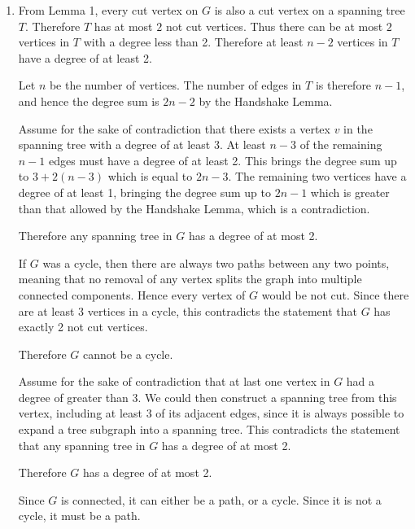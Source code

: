 \documentclass{article}
\begin{document}
\begin{solution}
\begin{enumerate}[label = (\alph*)]
    \begin{lemma}
        A connected graph with at least 2 vertices has at least 2 not cut vertices.
    \end{lemma}
    \begin{proof}
        Trivially from Lemmas 1 and 2.
    \end{proof}

    If there exists a connected component $C$ in $G$ which contains more than $2$ vertices, then $G$ will have at least $2$ not cut vertices (Lemma 3).
    Otherwise if all connected components contain only $1$ vertex, then $G$ has at least $2$ isolated vertices. As isolated vertices are not cut, 
    we can conclude that $G$ has at least 2 not cut vertices.
    \pagebreak
    \item From Lemma 1, every cut vertex on $G$ is also a cut vertex on a spanning tree $T$. 
    Therefore $T$ has at most $2$ not cut vertices.
    Thus there can be at most $2$ vertices in $T$ with a degree less than 2.
    Therefore at least $n-2$ vertices in $T$ have a degree of at least 2.
    
    Let $n$ be the number of vertices. The number of edges in $T$ is therefore $n-1$, and hence the degree sum is $2n-2$ by the Handshake Lemma.
    
    Assume for the sake of contradiction that there exists a vertex $v$ in the spanning tree 
    with a degree of at least $3$. At least $n-3$ of the remaining $n-1$ edges must have a degree of at least 2.
    This brings the degree sum up to $3 + 2(n-3)$ which is equal to $2n-3$.
    The remaining two vertices have a degree of at least 1, bringing the degree sum up to $2n-1$ which is greater than that allowed by the Handshake Lemma, which is a contradiction.

    Therefore any spanning tree in $G$ has a degree of at most 2.

    If $G$ was a cycle, then there are always two paths between any two points, meaning that no removal of any vertex splits the graph into multiple connected components.
    Hence every vertex of $G$ would be not cut. Since there are at least $3$ vertices in a cycle, this contradicts the statement that $G$ has exactly 2 not cut vertices.

    Therefore $G$ cannot be a cycle.

    Assume for the sake of contradiction that at last one vertex in $G$ had a degree of greater than 3.
    We could then construct a spanning tree from this vertex, including at least 3 of its adjacent edges, since 
    it is always possible to expand a tree subgraph into a spanning tree.
    This contradicts the statement that any spanning tree in $G$ has a degree of at most 2.
    
    Therefore $G$ has a degree of at most 2.

    Since $G$ is connected, it can either be a path, or a cycle. Since it is not a cycle, it must be a path.


\end{enumerate}
\end{solution}
\end{document}
